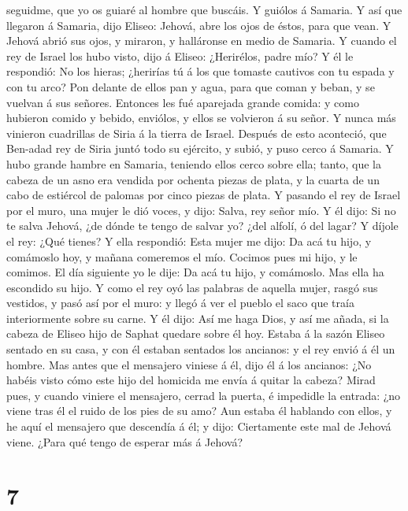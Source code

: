 seguidme, que yo os guiaré al hombre que buscáis. Y guiólos á Samaria.
 Y así que llegaron á Samaria, dijo Eliseo: Jehová, abre
los ojos de éstos, para que vean. Y Jehová abrió sus ojos, y miraron, y
halláronse en medio de Samaria.  Y cuando el rey de Israel
los hubo visto, dijo á Eliseo: ¿Herirélos, padre mío?  Y él
le respondió: No los hieras; ¿herirías tú á los que tomaste cautivos con
tu espada y con tu arco? Pon delante de ellos pan y agua, para que coman
y beban, y se vuelvan á sus señores.  Entonces les fué
aparejada grande comida: y como hubieron comido y bebido, enviólos, y
ellos se volvieron á su señor. Y nunca más vinieron cuadrillas de Siria
á la tierra de Israel.  Después de esto aconteció, que
Ben-adad rey de Siria juntó todo su ejército, y subió, y puso cerco á
Samaria.  Y hubo grande hambre en Samaria, teniendo ellos
cerco sobre ella; tanto, que la cabeza de un asno era vendida por
ochenta piezas de plata, y la cuarta de un cabo de estiércol de palomas
por cinco piezas de plata.  Y pasando el rey de Israel por
el muro, una mujer le dió voces, y dijo: Salva, rey señor mío.
 Y él dijo: Si no te salva Jehová, ¿de dónde te tengo de
salvar yo? ¿del alfolí, ó del lagar?  Y díjole el rey: ¿Qué
tienes? Y ella respondió: Esta mujer me dijo: Da acá tu hijo, y
comámoslo hoy, y mañana comeremos el mío.  Cocimos pues mi
hijo, y le comimos. El día siguiente yo le dije: Da acá tu hijo, y
comámoslo. Mas ella ha escondido su hijo.  Y como el rey
oyó las palabras de aquella mujer, rasgó sus vestidos, y pasó así por el
muro: y llegó á ver el pueblo el saco que traía interiormente sobre su
carne.  Y él dijo: Así me haga Dios, y así me añada, si la
cabeza de Eliseo hijo de Saphat quedare sobre él hoy. 
Estaba á la sazón Eliseo sentado en su casa, y con él estaban sentados
los ancianos: y el rey envió á él un hombre. Mas antes que el mensajero
viniese á él, dijo él á los ancianos: ¿No habéis visto cómo este hijo
del homicida me envía á quitar la cabeza? Mirad pues, y cuando viniere
el mensajero, cerrad la puerta, é impedidle la entrada: ¿no viene tras
él el ruido de los pies de su amo?  Aun estaba él hablando
con ellos, y he aquí el mensajero que descendía á él; y dijo:
Ciertamente este mal de Jehová viene. ¿Para qué tengo de esperar más á
Jehová?

\hypertarget{section-6}{%
\section{7}\label{section-6}}

